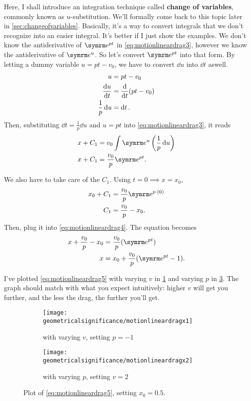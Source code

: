 Here, I shall introduce an integration technique called \textbf{change of variables}, commonly known as $u$-substitution. We'll formally come back to this topic later in \cref{sec:changeofvariables}. Basically, it's a way to convert integrals that we don't recognize into an easier integral. It's better if I just show the examples. We don't know the antiderivative of $\e^{pt}$ in \cref{eq:motionlineardrag3}, however we know the antiderivative of $\e^{u}$. So let's convert $\e^{pt}$ into that form. By letting a dummy variable $u = pt - v_0$, we have to convert $\dd{u}$ into $\dd{t}$ aswell.
\begin{align*}
    u &= pt - v_0 \\
    \dv{u}{t} &= \dv{t}(pt - v_0) \\
    \frac{1}{p}\dd{u} &= \dd{t}.
\end{align*}
Then, substituting $\dd{t} = \frac{1}{p}\dd{u}$ and $u = pt$ into \cref{eq:motionlineardrag3}, it reads
\begin{align}
    x + C_1 &= v_0\int\e^{u}\left(\frac{1}{p}\dd{u}\right) \nonumber\\
    x + C_1 &= \frac{v_0}{p}\e^{pt}. \label{eq:motionlineardrag4}
\end{align}

We also have to take care of the $C_1$. Using $t = 0 \implies x = x_0$,
\begin{align*}
    x_0 + C_1 &= \frac{v_0}{p}\e^{p\cdot(0)} \\
    C_1 &= \frac{v_0}{p} - x_0.
\end{align*}
Then, plug it into \cref{eq:motionlineardrag4}. The equation becomes
\begin{align}
    x + \frac{v_0}{p} - x_0 &= \frac{v_0}{p}(\e^{pt}) \nonumber\\
    x &= x_0 + \frac{v_0}{p}(\e^{pt} - 1). \label{eq:motionlineardrag5}
\end{align}

I've plotted \cref{eq:motionlineardrag5} with varying $v$ in \cref{fig:motionlineardragx1} and varying $p$ in \cref{fig:motionlineardragx2}. The graph should match with what you expect intuitively: higher $v$ will get you further, and the less the drag, the further you'll get.

\begin{figure}[ht]
    \centering
    \begin{subfigure}[l]{0.45\textwidth}
        \centering
        \texttt{[image: geometricalsignificance/motionlineardragx1]}
        \caption{with varying $v$, setting $p = -1$}
        \label{fig:motionlineardragx1}
    \end{subfigure}
    \begin{subfigure}[r]{0.45\textwidth}
        \centering
        \texttt{[image: geometricalsignificance/motionlineardragx2]}
        \caption{with varying $p$, setting $v = 2$}
        \label{fig:motionlineardragx2}
    \end{subfigure}
    \caption{Plot of \cref{eq:motionlineardrag5}, setting $x_0 = 0.5$.}
\end{figure}

